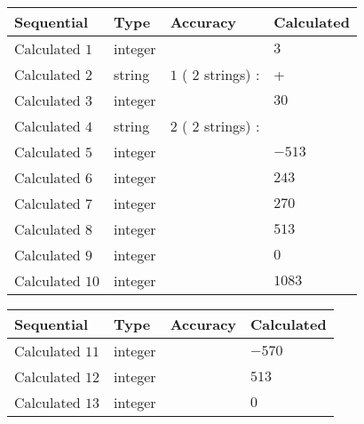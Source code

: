 \documentclass[12pt]{article}
\begin{document}
  
\noindent\begin{tabular}{|l|l|l|l|}
\hline
 Sequential & Type & Accuracy & Calculated \\ 
\hline
 
 
  Calculated $           1$ & integer &  & 
  $ 3 $ 
 \\  \hline  
 
 
  Calculated $           2$ & string & $           1 $ ( $          2 $ strings)
 : 
 & +
 \\  \hline  
 
 
  Calculated $           3$ & integer &  & 
  $ 30 $ 
 \\  \hline  
 
 
  Calculated $           4$ & string & $           2 $ ( $          2 $ strings)
 : 
 & 
 \\  \hline  
 
 
  Calculated $           5$ & integer &  & 
  $ -513 $ 
 \\  \hline  
 
 
  Calculated $           6$ & integer &  & 
  $ 243 $ 
 \\  \hline  
 
 
  Calculated $           7$ & integer &  & 
  $ 270 $ 
 \\  \hline  
 
 
  Calculated $           8$ & integer &  & 
  $ 513 $ 
 \\  \hline  
 
 
  Calculated $           9$ & integer &  & 
  $ 0 $ 
 \\  \hline  
 
 
  Calculated $          10$ & integer &  & 
  $ 1083 $ 
 \\  \hline  
 \end{tabular}
   
   
  
  
\noindent\begin{tabular}{|l|l|l|l|}
\hline
 Sequential & Type & Accuracy & Calculated \\ 
\hline
 
 
  Calculated $          11$ & integer &  & 
  $ -570 $ 
 \\  \hline  
 
 
  Calculated $          12$ & integer &  & 
  $ 513 $ 
 \\  \hline  
 
 
  Calculated $          13$ & integer &  & 
  $ 0 $ 
 \\  \hline  
 \end{tabular}
   
\end{document}

